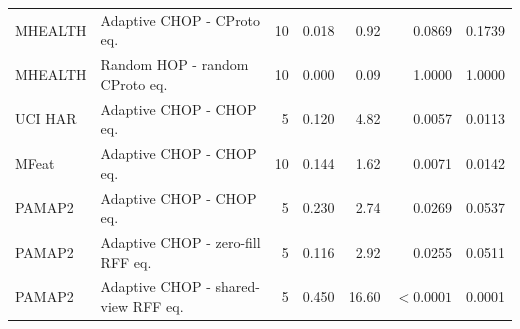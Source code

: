 \begin{table}[t]
{\begin{tabular}{llrrrrr}
MHEALTH & Adaptive CHOP - CProto eq. & 10 & 0.018 & 0.92 & 0.0869 & 0.1739 \\
MHEALTH & Random HOP - random CProto eq. & 10 & 0.000 & 0.09 & 1.0000 & 1.0000 \\
UCI HAR & Adaptive CHOP - CHOP eq. & 5 & 0.120 & 4.82 & 0.0057 & 0.0113 \\
MFeat & Adaptive CHOP - CHOP eq. & 10 & 0.144 & 1.62 & 0.0071 & 0.0142 \\
PAMAP2 & Adaptive CHOP - CHOP eq. & 5 & 0.230 & 2.74 & 0.0269 & 0.0537 \\
PAMAP2 & Adaptive CHOP - zero-fill RFF eq. & 5 & 0.116 & 2.92 & 0.0255 & 0.0511 \\
PAMAP2 & Adaptive CHOP - shared-view RFF eq. & 5 & 0.450 & 16.60 & \(<0.0001\) & 0.0001 \\
\bottomrule
\end{tabular}%
}
\end{table}

